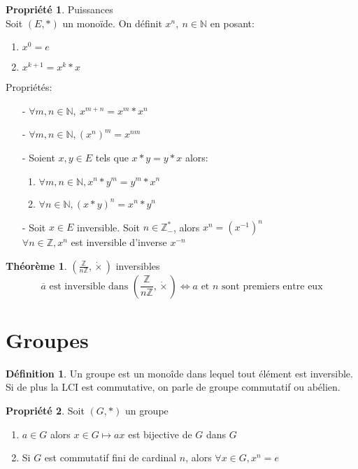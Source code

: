 \documentclass[fleqn]{article}
\theoremstyle{definition} \newtheorem*{defi}{D\'efinition}
\theoremstyle{definition} \newtheorem*{theo}{Th\'eor\`eme}
\theoremstyle{definition} \newtheorem*{coro}{Corollaire}
\theoremstyle{remark} \newtheorem*{rqs}{Remarques}
\theoremstyle{definition} \newtheorem*{prop}{Propri\'et\'e}
\begin{document}
\begin{prop} Puissances \\
Soit $(E, *)$ un mono\"ide. On d\'efinit $x^n,\ n \in \mathbb{N}$ en posant:
	\begin{enumerate}
		\item $x^0 = e$
		\item $x^{k+1} = x^k * x$
	\end{enumerate}
	Propri\'et\'es:
	\begin{itemize}
		\item [-] $\forall m,n \in \mathbb{N},\ x^{m+n} = x^m * x^n$
		\item [-] $\forall m,n \in \mathbb{N}, (x^n)^m = x^{nm}$
		\item [-] Soient $x,y \in E$ tels que $x*y = y*x$ alors:
			\begin{enumerate}
				\item $\forall m,n \in \mathbb{N}, x^n * y^m = y^m * x^n$
				\item $\forall n \in \mathbb{N}, (x*y)^n = x^n * y^n$
			\end{enumerate}
		\item [-] Soit $x \in E$ inversible. Soit $n \in \mathbb{Z}_-^*$, alors $x^n = (x^{-1})^n$\\
			$\forall n \in \mathbb{Z}, x^n$ est inversible d'inverse $x^{-n}$
	\end{itemize}
\end{prop}

\begin{theo} $(\frac{\mathbb{Z}}{n\mathbb{Z}}, \dot\times)$ inversibles
\[\overline{a} \text{ est inversible dans } (\frac{\mathbb{Z}}{n\mathbb{Z}}, \dot\times) \Leftrightarrow a \text{ et } n
	\text{ sont premiers entre eux}\]

\end{theo}

\section{Groupes}
\begin{defi}
	Un groupe est un mono\^ide dans lequel tout \'el\'ement est inversible. Si de plus la LCI est commutative, on parle de groupe commutatif
	ou ab\'elien.
\end{defi}

\begin{prop} Soit $(G, *)$ un groupe
	\begin{enumerate}
		\item $a \in G$ alors $x \in G \mapsto ax$ est bijective de $G$ dans $G$
		\item Si $G$ est commutatif fini de cardinal $n$, alors $\forall x \in G, x^n = e$
	\end{enumerate}
\end{prop}
\end{document}
